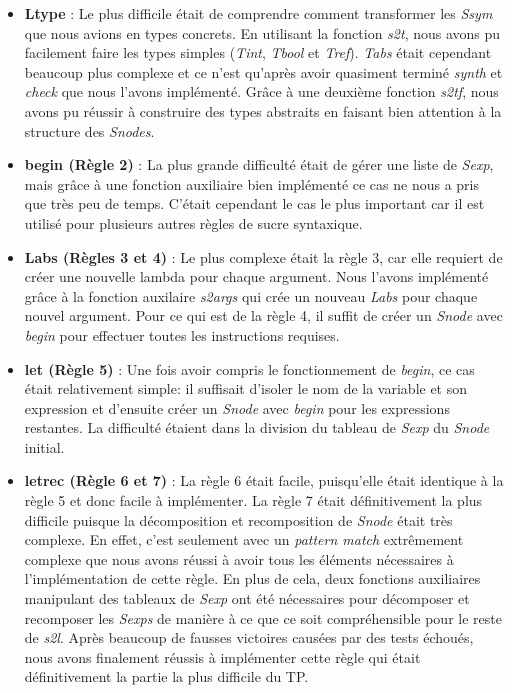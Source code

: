\documentclass{article}
\begin{document}
\begin{itemize}
    \item \textbf{Ltype} : Le plus difficile était de comprendre comment transformer les \textit{Ssym} que nous avions en types concrets. En utilisant la fonction \textit{s2t}, nous avons pu facilement faire les types simples (\textit{Tint}, \textit{Tbool} et \textit{Tref}). \textit{Tabs} était cependant beaucoup plus complexe et ce n'est qu'après avoir quasiment terminé \textit{synth} et \textit{check} que nous l'avons implémenté. Grâce à une deuxième fonction \textit{s2tf}, nous avons pu réussir à construire des types abstraits en faisant bien attention à la structure des \textit{Snodes}.
    \item \textbf{begin (Règle 2)} : La plus grande difficulté était de gérer une liste de \textit{Sexp}, mais grâce à une fonction auxiliaire bien implémenté ce cas ne nous a pris que très peu de temps. C'était cependant le cas le plus important car il est utilisé pour plusieurs autres règles de sucre syntaxique.
    \item \textbf{Labs (Règles 3 et 4)} : Le plus complexe était la règle 3, car elle requiert de créer une nouvelle lambda pour chaque argument. Nous l'avons implémenté grâce à la fonction auxilaire \textit{s2args} qui crée un nouveau \textit{Labs} pour chaque nouvel argument. Pour ce qui est de la règle 4, il suffit de créer un \textit{Snode} avec \textit{begin} pour effectuer toutes les instructions requises.
    \item \textbf{let (Règle 5)} : Une fois avoir compris le fonctionnement de \textit{begin}, ce cas était relativement simple: il suffisait d'isoler le nom de la variable et son expression et d'ensuite créer un \textit{Snode} avec \textit{begin} pour les expressions restantes. La difficulté étaient dans la division du tableau de \textit{Sexp} du \textit{Snode} initial.
    \item \textbf{letrec (Règle 6 et 7)} : La règle 6 était facile, puisqu'elle était identique à la règle 5 et donc facile à implémenter. La règle 7 était définitivement la plus difficile puisque la décomposition et recomposition de \textit{Snode} était très complexe. En effet, c'est seulement avec un \textit{pattern match} extrêmement complexe que nous avons réussi à avoir tous les éléments nécessaires à l'implémentation de cette règle. En plus de cela, deux fonctions auxiliaires manipulant des tableaux de \textit{Sexp} ont été nécessaires pour décomposer et recomposer les \textit{Sexps} de manière à ce que ce soit compréhensible pour le reste de \textit{s2l}. Après beaucoup de fausses victoires causées par des tests échoués, nous avons finalement réussis à implémenter cette règle qui était définitivement la partie la plus difficile du TP.
    
\end{itemize}
\end{document}
